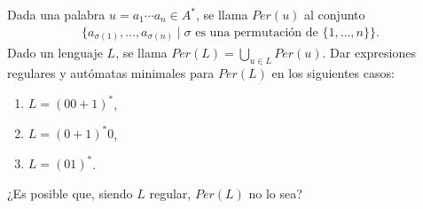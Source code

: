 \begin{ejercicio}
    Dada una palabra $u = a_1 \cdots a_n \in A^*$, se llama $Per(u)$ al conjunto
    \begin{align*}
        \{a_{\sigma(1)}, \ldots, a_{\sigma(n)} \mid \sigma \text{ es una permutación de } \{1, \ldots, n\}\}.
    \end{align*}
    Dado un lenguaje $L$, se llama $Per(L) = \bigcup_{u \in L} Per(u)$.
    Dar expresiones regulares y autómatas minimales para $Per(L)$ en los siguientes casos:
    \begin{enumerate}
        \item $L = (00 + 1)^*$,
        \item $L = (0 + 1)^*0$,
        \item $L = (01)^*$.
    \end{enumerate}
    ¿Es posible que, siendo $L$ regular, $Per(L)$ no lo sea?
\end{ejercicio}
